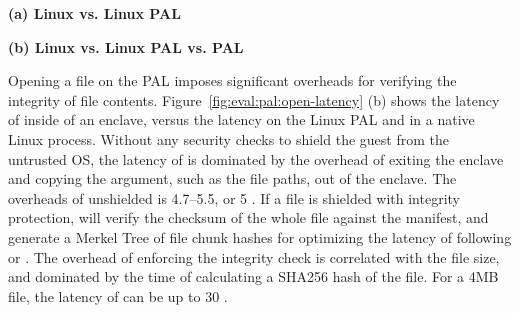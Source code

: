 \begin{figure*}[t!]
\centering
\footnotesize
{}
\parbox{0.49\textwidth}{\centering\bf (a) Linux vs. Linux PAL}
\parbox{0.49\textwidth}{\centering\bf (b) Linux vs. Linux PAL vs. \sgx{} PAL}
\caption{Latency of  on the Linux PAL  and \sgx{} PAL, versus  on Linux.
Lower is better.
Figure (a) compares  on the Linux PAL,
with and without a \seccomp{} filter ({\bf +SC})
and reference monitor ({\bf +RM}), against  on Linux. Figure (b) compares  on a \sgx{} PAL,
with and without integrity checks ({\bf +CHK}),
against the Linux PAL and  on Linux.}
\label{fig:eval:pal:open-latency}
\end{figure*}


Opening a file on the \sgx{} PAL
imposes significant overheads for verifying
the integrity of file contents.
Figure~\ref{fig:eval:pal:open-latency} (b) shows the latency of  inside of an \sgx{} enclave, versus the latency on the Linux PAL
and in a native Linux process.
Without any security checks to shield the guest from the untrusted OS,
the latency of  is dominated by the overhead of exiting the enclave and copying the argument, such as the file paths, out of the enclave.
The overheads of unshielded  is 4.7--5.5\x{}, or \roughly{}5 \usec{}.
If a file is shielded with integrity protection,
 will verify the checksum of the whole file against the manifest, and generate a Merkel Tree of file chunk hashes
for optimizing the latency of following  or .
The overhead of enforcing the integrity check is correlated with the file size, and dominated by the time of
calculating a SHA256 hash of the file.
For a 4MB file, the latency of  can be up to \roughly{}30 \msec{}.









